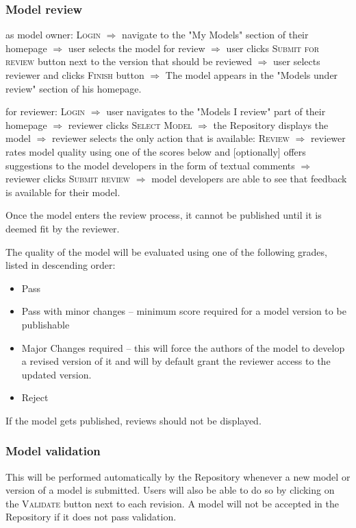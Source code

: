 \subsubsection{Model review}
{as model owner: \textsc{Login} $\Rightarrow$ navigate to the "My Models" section of their homepage $\Rightarrow$ user selects the model for review $\Rightarrow$ user clicks \textsc{Submit for review} button next to the version that should be reviewed $\Rightarrow$ user selects reviewer and clicks \textsc{Finish} button $\Rightarrow$ The model appears in the "Models under review" section of his homepage.%

for reviewer: \textsc{Login} $\Rightarrow$ user navigates to the "Models I review" part of their homepage $\Rightarrow$ reviewer clicks \textsc{Select Model} $\Rightarrow$ the Repository displays the model $\Rightarrow$ reviewer selects the only action that is available: \textsc{Review} $\Rightarrow$ reviewer rates model quality using one of the scores below and [optionally] offers suggestions to the model developers in the form of textual comments $\Rightarrow$ reviewer clicks \textsc{Submit review} $\Rightarrow$ model developers are able to see that feedback is available for their model.  %

Once the model enters the review process, it cannot be published until it is deemed fit by the reviewer.

\begin{techNote}
The quality of the model will be evaluated using one of the following grades, listed in descending order:
\begin{itemize}
\item Pass
\item Pass with minor changes -- minimum score required for a model version to be publishable
\item Major Changes required -- this will force the authors of the model to develop a revised version of it and will by default grant the reviewer access to the updated version. 
\item Reject
\end{itemize}
If the model gets published, reviews should not be displayed. 
\end{techNote}


\subsubsection{Model validation}
This will be performed automatically by the Repository whenever a new model or version of a model is submitted. Users will also be able to do so by clicking on the \textsc{Validate} button next to each revision. A model will not be accepted in the Repository if it does not pass validation. 


}
